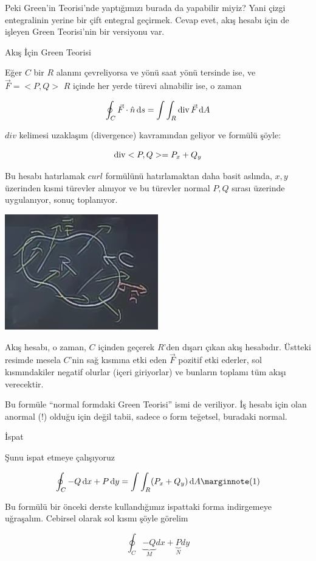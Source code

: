 \documentclass[12pt,fleqn]{article}\usepackage{../../common}
\begin{document}
Peki Green'in Teorisi'nde yaptığımızı burada da yapabilir miyiz? Yani çizgi
entegralinin yerine bir çift entegral geçirmek. Cevap evet, akış hesabı için de
işleyen Green Teorisi'nin bir versiyonu var.

Akış İçin Green Teorisi

Eğer $C$ bir $R$ alanını çevreliyorsa ve yönü saat yönü tersinde ise, ve
$\vec{F}=< P,Q >$ $R$ içinde her yerde türevi alınabilir ise, o zaman 

$$ \oint_C \vec{F} \cdot \hat{n} \,\mathrm{d} s = 
\int \int_R \operatorname{div} \vec{F} \,\mathrm{d} A
$$

$div$ kelimesi uzaklaşım (divergence) kavramından geliyor ve formülü şöyle:

$$ \operatorname{div} < P,Q > = P_x + Q_y $$

Bu hesabı hatırlamak $curl$ formülünü hatırlamaktan daha basit aslında,
$x,y$ üzerinden kısmi türevler alınıyor ve bu türevler normal $P,Q$ sırası
üzerinde uygulanıyor, sonuç toplanıyor. 

\includegraphics[height=5cm]{23_8.png}

Akış hesabı, o zaman, $C$ içinden geçerek $R$'den dışarı çıkan akış
hesabıdır. Üstteki resimde mesela $C$'nin sağ kısmına etki eden $\vec{F}$
pozitif etki ederler, sol kısmındakiler negatif olurlar (içeri giriyorlar)
ve bunların toplamı tüm akışı verecektir. 

Bu formüle ``normal formdaki Green Teorisi'' ismi de veriliyor. İş hesabı
için olan anormal (!) olduğu için değil tabii, sadece o form teğetsel,
buradaki normal. 

İspat

Şunu ispat etmeye çalışıyoruz

$$
\oint_C -Q \ud x + P \ud y = \int \int_R (P_x + Q_y) \ud A 
\mlabel{1}
$$

Bu formülü bir önceki derste kullandığımız ispattaki forma indirgemeye
uğraşalım. Cebirsel olarak sol kısmı şöyle görelim

$$ \oint_C 
\underbrace{-Q}_{M}dx + 
\underbrace{P}_{N}dy 
$$
\end{document}
